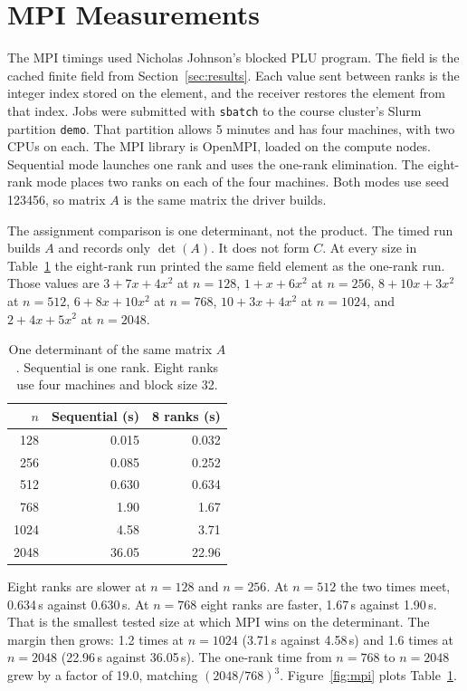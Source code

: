\section{MPI Measurements}
\label{sec:mpi-results}

The MPI timings used Nicholas Johnson's blocked PLU program.
The field is the cached finite field from Section~\ref{sec:results}.
Each value sent between ranks is the integer index stored on the element, and the receiver restores the element from that index.
Jobs were submitted with \texttt{sbatch} to the course cluster's Slurm partition \texttt{demo}.
That partition allows 5 minutes and has four machines, with two CPUs on each.
The MPI library is OpenMPI, loaded on the compute nodes.
Sequential mode launches one rank and uses the one-rank elimination.
The eight-rank mode places two ranks on each of the four machines.
Both modes use seed 123456, so matrix \(A\) is the same matrix the driver builds.

The assignment comparison is one determinant, not the product.
The timed run builds \(A\) and records only \(\det(A)\).
It does not form \(C\).
At every size in Table~\ref{tab:det} the eight-rank run printed the same field element as the one-rank run.
Those values are \(3 + 7x + 4x^2\) at \(n = 128\), \(1 + x + 6x^2\) at \(n = 256\), \(8 + 10x + 3x^2\) at \(n = 512\), \(6 + 8x + 10x^2\) at \(n = 768\), \(10 + 3x + 4x^2\) at \(n = 1024\), and \(2 + 4x + 5x^2\) at \(n = 2048\).

\begin{table}[!t]
\caption{One determinant of the same matrix \(A\). Sequential is one rank. Eight ranks use four machines and block size 32.}
\label{tab:det}
\centering
\scriptsize
\begin{tabular}{@{}rrr@{}}
\toprule
\(n\) & Sequential (s) & 8 ranks (s) \\
\midrule
128 & 0.015 & 0.032 \\
256 & 0.085 & 0.252 \\
512  & 0.630 & 0.634 \\
768  & 1.90  & 1.67  \\
1024 & 4.58  & 3.71  \\
2048 & 36.05 & 22.96 \\
\bottomrule
\end{tabular}
\end{table}

Eight ranks are slower at \(n = 128\) and \(n = 256\).
At \(n = 512\) the two times meet, 0.634\,s against 0.630\,s.
At \(n = 768\) eight ranks are faster, 1.67\,s against 1.90\,s.
That is the smallest tested size at which MPI wins on the determinant.
The margin then grows: 1.2 times at \(n = 1024\) (3.71\,s against 4.58\,s) and 1.6 times at \(n = 2048\) (22.96\,s against 36.05\,s).
The one-rank time from \(n = 768\) to \(n = 2048\) grew by a factor of 19.0, matching \((2048/768)^3\).
Figure~\ref{fig:mpi} plots Table~\ref{tab:det}.

